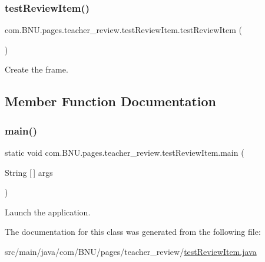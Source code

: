 \subsubsection{\texorpdfstring{test\+Review\+Item()}{testReviewItem()}}
{\footnotesize\ttfamily com.\+B\+N\+U.\+pages.\+teacher\+\_\+review.\+test\+Review\+Item.\+test\+Review\+Item (\begin{DoxyParamCaption}{ }\end{DoxyParamCaption})}

Create the frame. 

\subsection{Member Function Documentation}
\mbox{\label{classcom_1_1_b_n_u_1_1pages_1_1teacher__review_1_1test_review_item_a85d41fa69ecef69861f14f199b070d0f}} 
\subsubsection{\texorpdfstring{main()}{main()}}
{\footnotesize\ttfamily static void com.\+B\+N\+U.\+pages.\+teacher\+\_\+review.\+test\+Review\+Item.\+main (\begin{DoxyParamCaption}\item[{String \mbox{[}$\,$\mbox{]}}]{args }\end{DoxyParamCaption})\hspace{0.3cm}{\ttfamily [static]}}

Launch the application. 

The documentation for this class was generated from the following file\+:\begin{DoxyCompactItemize}
\item 
src/main/java/com/\+B\+N\+U/pages/teacher\+\_\+review/\mbox{\hyperlink{test_review_item_8java}{test\+Review\+Item.\+java}}\end{DoxyCompactItemize}
